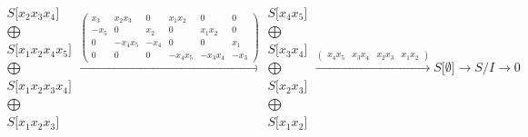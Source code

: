 \documentclass[12pt,a3paper,landscape]{amsart}
\numberwithin{equation}{section}
\theoremstyle{plain}
\theoremstyle{definition}
\begin{document}
$$\begin{matrix}
S \lbrack x_{2}x_{3}x_{4} \rbrack \\ \bigoplus \\
S \lbrack x_{1}x_{2}x_{4}x_{5} \rbrack \\ \bigoplus \\
S \lbrack x_{1}x_{2}x_{3}x_{4} \rbrack \\ \bigoplus \\
S \lbrack x_{1}x_{2}x_{3} \rbrack
\end{matrix}
\xrightarrow{\left( \begin{matrix}
x_{3} & x_{2}x_{3} & 0 & x_{1}x_{2} & 0 & 0 \\
-x_{5} & 0 & x_{2} & 0 & x_{1}x_{2} & 0 \\
0 & -x_{4}x_{5} & -x_{4} & 0 & 0 & x_{1} \\
0 & 0 & 0 & -x_{4}x_{5} & -x_{3}x_{4} & -x_{3}
\end{matrix} \right)}\begin{matrix}
S \lbrack x_{4}x_{5} \rbrack \\ \bigoplus \\
S \lbrack x_{3}x_{4} \rbrack \\ \bigoplus \\
S \lbrack x_{2}x_{3} \rbrack \\ \bigoplus \\
S \lbrack x_{1}x_{2} \rbrack
\end{matrix}
\xrightarrow{\left( \begin{matrix}
x_{4}x_{5} & x_{3}x_{4} & x_{2}x_{3} & x_{1}x_{2}
\end{matrix} \right)}S \lbrack \emptyset \rbrack \rightarrow S/I \rightarrow 0
$$
\end{document}
